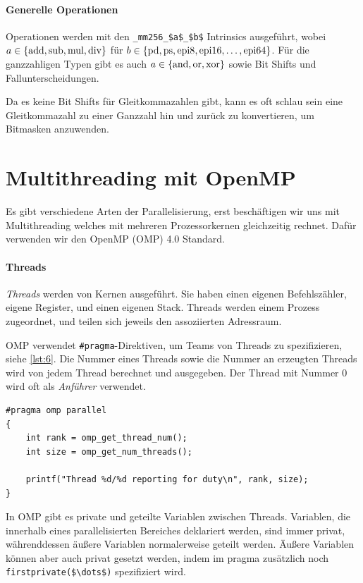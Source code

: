 \paragraph{Generelle Operationen}
Operationen werden mit den \lstinline|_mm256_$a$_$b$| Intrinsics ausgeführt, wobei \(a \in \{\text{\lstinline|add|}, \text{\lstinline|sub|}, \text{\lstinline|mul|}, \text{\lstinline|div|}\}\) für \(b \in \{\text{\lstinline|pd|}, \text{\lstinline|ps|}, \text{\lstinline|epi8|}, \text{\lstinline|epi16|}, \dots, \text{\lstinline|epi64|}\}\). Für die ganzzahligen Typen gibt es auch \(a \in \{\text{\lstinline|and|}, \text{\lstinline|or|}, \text{\lstinline|xor|}\}\) sowie Bit Shifts und Fallunterscheidungen.

Da es keine Bit Shifts für Gleitkommazahlen gibt, kann es oft schlau sein eine Gleitkommazahl zu einer Ganzzahl hin und zurück zu konvertieren, um Bitmasken anzuwenden.

\section{Multithreading mit OpenMP}
Es gibt verschiedene Arten der Parallelisierung, erst beschäftigen wir uns mit Multithreading welches mit mehreren Prozessorkernen gleichzeitig rechnet.
Dafür verwenden wir den OpenMP (OMP) 4.0 Standard.

\paragraph{Threads} \emph{Threads} werden von Kernen ausgeführt.
Sie haben einen eigenen Befehlszähler, eigene Register, und einen eigenen Stack.
Threads werden einem Prozess zugeordnet, und teilen sich jeweils den assoziierten Adressraum.

OMP verwendet \lstinline|#pragma|-Direktiven, um Teams von Threads zu spezifizieren, siehe \autoref{lst:6}.
Die Nummer eines Threads sowie die Nummer an erzeugten Threads wird von jedem Thread berechnet und ausgegeben.
Der Thread mit Nummer 0 wird oft als \emph{Anführer} verwendet.

\begin{lstlisting}[label={lst:6}]
#pragma omp parallel
{
    int rank = omp_get_thread_num();
    int size = omp_get_num_threads();

    printf("Thread %d/%d reporting for duty\n", rank, size);
}
\end{lstlisting}

In OMP gibt es private und geteilte Variablen zwischen Threads.
Variablen, die innerhalb eines parallelisierten Bereiches deklariert werden, sind immer privat, währenddessen äußere Variablen normalerweise geteilt werden.
Äußere Variablen können aber auch privat gesetzt werden, indem im pragma zusätzlich noch \lstinline|firstprivate($\dots$)| spezifiziert wird.

